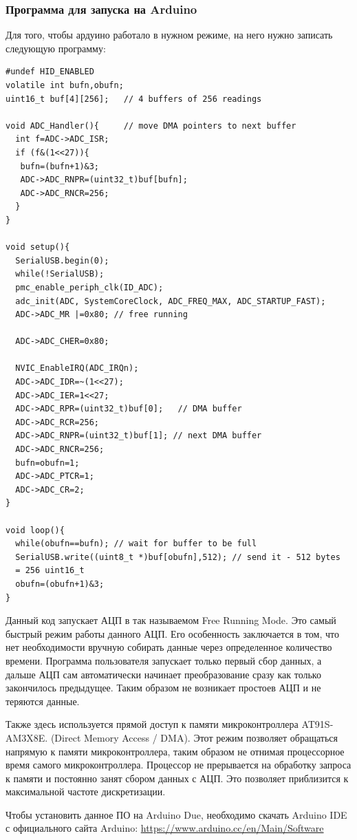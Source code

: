 \documentclass[../paper.tex]{subfiles}
\begin{document}
\subsubsection{Программа для запуска на Arduino}
Для того, чтобы ардуино работало в нужном режиме, на него нужно записать следующую программу:
\begin{verbatim}
#undef HID_ENABLED
volatile int bufn,obufn;
uint16_t buf[4][256];   // 4 buffers of 256 readings

void ADC_Handler(){     // move DMA pointers to next buffer
  int f=ADC->ADC_ISR;
  if (f&(1<<27)){
   bufn=(bufn+1)&3;
   ADC->ADC_RNPR=(uint32_t)buf[bufn];
   ADC->ADC_RNCR=256;
  } 
}

void setup(){
  SerialUSB.begin(0);
  while(!SerialUSB);
  pmc_enable_periph_clk(ID_ADC);
  adc_init(ADC, SystemCoreClock, ADC_FREQ_MAX, ADC_STARTUP_FAST);
  ADC->ADC_MR |=0x80; // free running

  ADC->ADC_CHER=0x80; 

  NVIC_EnableIRQ(ADC_IRQn);
  ADC->ADC_IDR=~(1<<27);
  ADC->ADC_IER=1<<27;
  ADC->ADC_RPR=(uint32_t)buf[0];   // DMA buffer
  ADC->ADC_RCR=256;
  ADC->ADC_RNPR=(uint32_t)buf[1]; // next DMA buffer
  ADC->ADC_RNCR=256;
  bufn=obufn=1;
  ADC->ADC_PTCR=1;
  ADC->ADC_CR=2;
}

void loop(){
  while(obufn==bufn); // wait for buffer to be full
  SerialUSB.write((uint8_t *)buf[obufn],512); // send it - 512 bytes
  = 256 uint16_t
  obufn=(obufn+1)&3;    
}
\end{verbatim}
Данный код запускает АЦП в так называемом Free Running Mode. Это самый быстрый режим работы данного АЦП. Его особенность заключается в том, что нет необходимости вручную собирать данные через определенное количество времени. Программа пользователя запускает только первый сбор данных, а дальше АЦП сам автоматически начинает преобразование сразу как только закончилось предыдущее. Таким образом не возникает простоев АЦП и не теряются данные.

Также здесь используется прямой доступ к памяти микроконтроллера AT91S-AM3X8E. (Direct Memory Access / DMA). Этот режим позволяет обращаться напрямую к памяти микроконтроллера, таким образом не отнимая процессорное время самого микроконтроллера. Процессор не прерывается на обработку запроса к памяти и постоянно занят сбором данных с АЦП. Это позволяет приблизится к максимальной частоте дискретизации.

Чтобы установить данное ПО на Arduino Due, необходимо скачать Arduino IDE с официального сайта Arduino: \url{https://www.arduino.cc/en/Main/Software}
\end{document}
